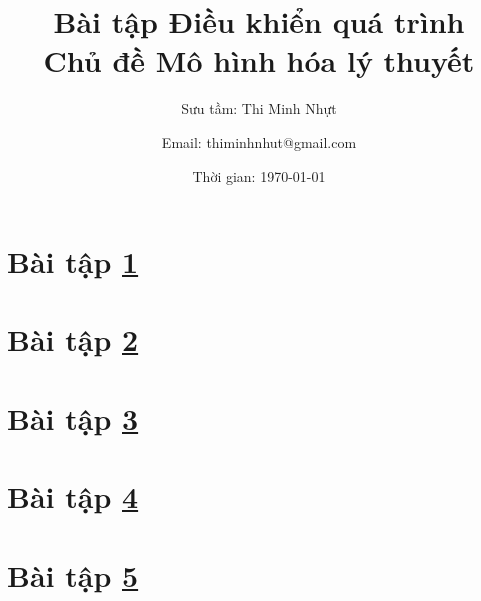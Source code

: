 \documentclass[11pt,a4paper]{article}
\title{\textbf{Bài tập Điều khiển quá trình \bigskip \\ Chủ đề Mô hình hóa lý thuyết}}
\author{Sưu tầm: Thi Minh Nhựt \and Email: thiminhnhut@gmail.com}
\date{Thời gian: \today}
\begin{document}
\maketitle

\section{Bài tập \ref{sec:baitap1-1binhchua}} \label{sec:baitap1-1binhchua}
    

\section{Bài tập \ref{sec:baitap2-1binhchua}} \label{sec:baitap2-1binhchua}
    

\section{Bài tập \ref{sec:baitap3-2binhchua}} \label{sec:baitap3-2binhchua}
    

\section{Bài tập \ref{sec:baitap4-2binhchua}} \label{sec:baitap4-2binhchua}
    

\section{Bài tập \ref{sec:baitap5-2binhchua}} \label{sec:baitap5-2binhchua}
    
\end{document}
